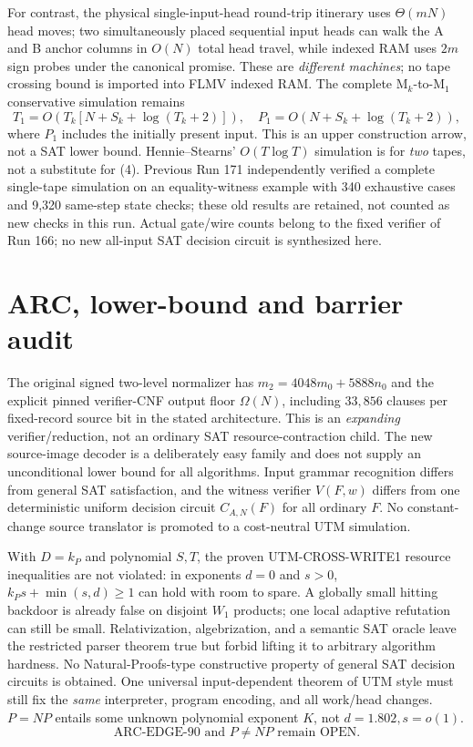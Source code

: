 \documentclass[11pt]{article}
\begin{document}
For contrast, the physical single-input-head
round-trip itinerary uses $\Theta(mN)$ head moves;
two simultaneously placed sequential input heads
can walk the A and B anchor columns in $O(N)$ total
head travel, while indexed RAM uses $2m$ sign probes
under the canonical promise. These are \emph{different
machines}; no tape crossing bound is imported into
FLMV indexed RAM. The complete M$_k$-to-M$_1$
conservative simulation remains
\[
 T_1=O(T_k[N+S_k+\log(T_k+2)]),\quad
 P_1=O(N+S_k+\log(T_k+2)),                             \tag{4}
\]
where $P_1$ includes the initially present input.
This is an upper construction arrow, not a SAT lower
bound. Hennie--Stearns' $O(T\log T)$ simulation is
for \emph{two} tapes, not a substitute for (4).
Previous Run 171 independently verified a complete
single-tape simulation on an equality-witness
example with 340 exhaustive cases and 9,320
same-step state checks; these old results are
retained, not counted as new checks in this run.
Actual gate/wire counts belong to the fixed verifier
of Run 166; no new all-input SAT decision circuit
is synthesized here.

\section{ARC, lower-bound and barrier audit}
The original signed two-level normalizer has
$m_2=4048m_0+5888n_0$ and the explicit pinned
verifier-CNF output floor $\Omega(N)$, including
$33{,}856$ clauses per fixed-record source bit
in the stated architecture. This is an
\emph{expanding} verifier/reduction, not an ordinary
SAT resource-contraction child. The new source-image
decoder is a deliberately easy family and does not
supply an unconditional lower bound for all
algorithms. Input grammar recognition differs from
general SAT satisfaction, and the witness verifier
$V(F,w)$ differs from one deterministic uniform
decision circuit $C_{A,N}(F)$ for all ordinary $F$.
No constant-change source translator is promoted to
a cost-neutral UTM simulation.

With $D=k_P$ and polynomial $S,T$, the proven
UTM-CROSS-WRITE1 resource inequalities are not
violated: in exponents $d=0$ and $s>0$,
$k_P s+\min(s,d)\ge1$ can hold with room to
spare. A globally small hitting backdoor is already
false on disjoint $W_1$ products; one local adaptive
refutation can still be small. Relativization,
algebrization, and a semantic SAT oracle leave
the restricted parser theorem true but forbid
lifting it to arbitrary algorithm hardness.
No Natural-Proofs-type constructive property of
general SAT decision circuits is obtained.
One universal input-dependent theorem of UTM
style must still fix the \emph{same} interpreter,
program encoding, and all work/head changes.
$P=NP$ entails some unknown polynomial exponent
$K$, not $d=1.802,s=o(1)$.
\[
 \boxed{\text{ARC-EDGE-90 and }P\ne NP\text{ remain OPEN}.}
\]
\end{document}
